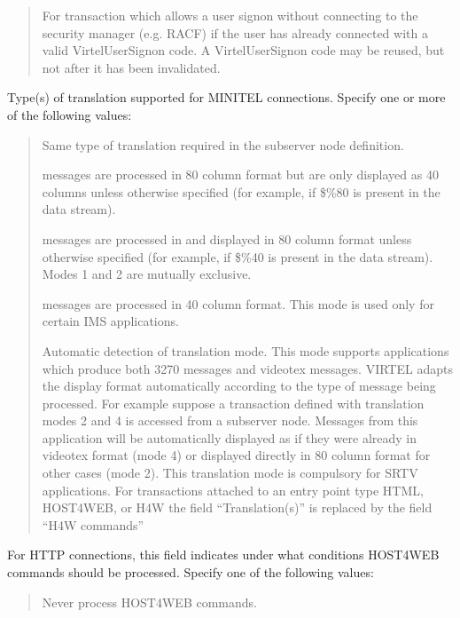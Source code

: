 \documentclass[letterpaper,10pt,english]{sphinxmanual}
\begin{document}
\begin{description}
\begin{quote}
\begin{description}
\sphinxAtStartPar
For transaction which allows a user signon without connecting to the security manager (e.g. RACF) if the user has already connected with a valid VirtelUserSignon code. A VirtelUserSignon code may be reused, but not after it has been invalidated.

\end{description}
\end{quote}

\sphinxAtStartPar
Type(s) of translation supported for MINITEL connections. Specify one or more of the following values:
\begin{quote}
\begin{description}
\sphinxAtStartPar
Same type of translation required in the sub\sphinxhyphen{}server node definition.

 messages are processed in 80 column format but are only displayed as 40 columns unless otherwise specified (for example, if \$\%80 is present in the data stream).

 messages are processed in and displayed in 80 column format unless otherwise specified (for example, if \$\%40 is present in the data stream).
Modes 1 and 2 are mutually exclusive.

 messages are processed in 40 column format. This mode is used only for certain IMS applications.

\sphinxAtStartPar
Automatic detection of translation mode.
This mode supports applications which produce both 3270 messages and videotex messages. VIRTEL adapts the display format automatically according to the type of message being processed. For example suppose a transaction defined with translation modes 2 and 4 is accessed from a sub\sphinxhyphen{}server node. Messages from this application will be automatically displayed as if they were already in videotex format (mode 4) or displayed directly in 80 column format for other cases (mode 2).
This translation mode is compulsory for SRTV applications.
For transactions attached to an entry point type HTML, HOST4WEB, or H4W the field “Translation(s)” is replaced by the field “H4W commands”

\end{description}
\end{quote}

\sphinxAtStartPar
For HTTP connections, this field indicates under what conditions HOST4WEB commands should be processed. Specify one of the following values:
\begin{quote}
\begin{description}
\sphinxAtStartPar
Never process HOST4WEB commands.


\end{description}
\end{quote}
\end{description}
\end{document}
